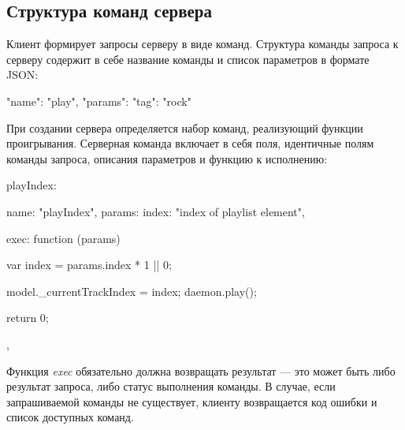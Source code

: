 \subsection{Структура команд сервера}

Клиент формирует запросы серверу в виде команд. Структура команды
запроса к серверу содержит в себе название команды и список параметров в
формате JSON: 

\begin{jsoncode}
  { 
    "name": "play", 
    "params": {
      "tag": "rock"
    } 
  }
\end{jsoncode}

При создании сервера определяется набор команд, реализующий функции
проигрывания. Серверная команда включает в себя поля, идентичные полям команды запроса,
описания параметров и функцию к исполнению:

\begin{jscode}
  playIndex: {
    name: "playIndex",
    params: { index: "index of playlist element"},

    exec: function (params) {

      var index = params.index * 1 || 0;
      
      model._currentTrackIndex = index;            
      daemon.play();

      return 0;
      
    }
  },

\end{jscode}

Функция \textit{exec} обязательно должна возвращать результат --- это
может быть либо результат запроса, либо статус выполнения
команды. В случае, если запрашиваемой команды не существует, клиенту
возвращается код ошибки и список доступных команд.